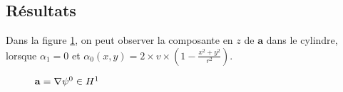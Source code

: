 

\subsection{Résultats}
Dans la figure \ref{az}, on peut observer la composante en $z$ de $\mathbf{a}$ dans le cylindre, lorsque $\alpha_1=0$ et $\alpha_0(x,y)=2\times v\times\left(1-\frac{x^2+y^2}{r^2}\right)$.

\begin{figure}[H]
\makebox[\textwidth][c]{
  \subfloat{\texttt{[image: az]}}\ 
  \subfloat{\texttt{[image: az1]}}
}
\caption{$\mathbf{a}={\nabla}\psi^0\in H^1$}
\label{az}
\end{figure}


